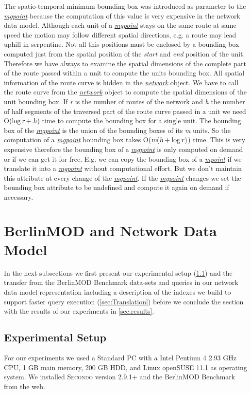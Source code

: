 \documentclass[a4paper]{article}
\newcommand{\secondo}{\textsc{Secondo}}
\newcommand{\bmodb} {BerlinMOD Benchmark}
\newcommand{\var}[1]{\textsl{#1}}
\newcommand{\dt}[1]{\textsl{\underline{#1}}}
\begin{document}
{The spatio-temporal minimum bounding box was introduced as parameter to the \dt{mgpoint} because the computation of this value is very expensive in the network data model. Although each unit of a \dt{mgpoint} stays on the same route at same speed the motion may follow different spatial directions, e.g. a route may lead uphill in serpentine. Not all this positions must be enclosed by a bounding box computed just from the spatial position of the \var{start} and \var{end} position of the unit. Therefore we have always to examine the spatial dimensions of the complete part of the route passed within a unit to compute the units bounding box. All spatial information of the route curve is hidden in the \dt{network} object. We have to call the route curve from the \dt{network} object to compute the spatial dimensions of the unit bounding box. If \var{r} is the number of routes of the network and \var{h} the number of half segments of the traversed part of the route curve passed in a unit we need O($\log \var{r} + \var{h}$) time to compute the bounding box for a single unit. The bounding box of the \dt{mgpoint} is the union of the bounding boxes of its \var{m} units. So the computation of a \dt{mgpoint} bounding box takes O($\var{m}(\var{h} + \log r)$) time. This is very expensive therefore the bounding box of a \dt{mgpoint} is only computed on demand or if we can get it for free. E.g. we can copy the bounding box of a \dt{mpoint} if we translate it into a \dt{mgpoint} without computational effort. But we don't maintain this attribute at every change of the \dt{mgpoint}. If the \dt{mgpoint} changes we set the bounding box attribute to be undefined and compute it again on demand if necessary.
\section{BerlinMOD and Network Data Model}
\label{sec:bmodbNetDataMod}
In the next subsections we first present our experimental setup (\ref{sec:scenario}) and the transfer from the \bmodb{} data-sets and queries in our network data model representation including a description of the indexes we build to support faster query execution (\ref{sec:Translation}) before we conclude the section with the results of our experiments in \ref{sec:results}.
\subsection{Experimental Setup}
\label{sec:scenario}
For our experiments we used a Standard PC with a Intel Pentium 4 2.93 GHz CPU, 1 GB main memory, 200 GB HDD, and Linux openSUSE 11.1 as operating system. We installed \secondo{} version 2.9.1+ and the \bmodb{} from the web.

}
\end{document}
